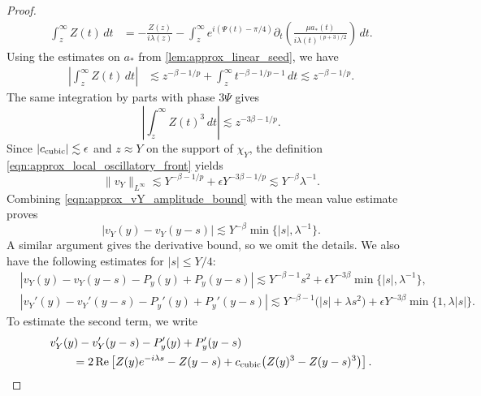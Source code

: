 \documentclass[11pt]{amsart}
\theoremstyle{definition}
\theoremstyle{remark}
\numberwithin{equation}{section}
\begin{document}
\begin{proof}
\begin{align*}
        \int_z^\infty Z(t)\,dt
        &=-\frac{Z(z)}{i\lambda(z)}
        -\int_z^\infty e^{i(\Psi(t)-\pi/4)}
        \partial_t\left(\frac{\mu a_*(t)}{i\lambda(t)^{(p+3)/2}}\right)\,dt.
    \end{align*}
    Using the estimates on $a_*$ from \cref{lem:approx_linear_seed}, we have
    \begin{align*}
        \left|\int_z^\infty Z(t)\,dt\right|
        &\lesssim z^{-\beta-1/p}+\int_z^\infty t^{-\beta-1/p-1}\,dt
        \lesssim z^{-\beta-1/p}.
    \end{align*}
    The same integration by parts with phase $3\Psi$ gives
    \[\left|\int_z^\infty Z(t)^3\,dt\right|\lesssim z^{-3\beta-1/p}.\]
    Since $|c_{\textup{cubic}}|\lesssim\epsilon$ and $z \approx Y$ on the support of $\chi_Y$, the definition \eqref{eqn:approx_local_oscillatory_front} yields
    \begin{equation}\label{eqn:approx_vY_amplitude_bound}
        \|v_Y\|_{L^\infty}
        \lesssim Y^{-\beta-1/p}+\epsilon Y^{-3\beta-1/p}
        \lesssim Y^{-\beta}\lambda^{-1}.
    \end{equation}
    Combining \eqref{eqn:approx_vY_amplitude_bound} with the mean value estimate proves
    \[|v_Y(y)-v_Y(y-s)|\lesssim Y^{-\beta}\min\{|s|,\lambda^{-1}\}.\]
    A similar argument gives the derivative bound, so we omit the details.
    We also have the following estimates for $|s|\leq Y/4$:
    \begin{equation}\label{eqn:approx_vY_plane_wave_comparison}
        \begin{aligned}
            &|v_Y(y)-v_Y(y-s)-P_y(y)+P_y(y-s)|\lesssim Y^{-\beta-1}s^2
            +\epsilon Y^{-3\beta}\min\{|s|,\lambda^{-1}\},\\
            &|v_Y'(y)-v_Y'(y-s)-P_y'(y)+P_y'(y-s)| \lesssim Y^{-\beta-1}\bigl(|s|+\lambda s^2\bigr)
            +\epsilon Y^{-3\beta}\min\{1,\lambda|s|\}.
        \end{aligned}
    \end{equation}
    To estimate the second term, we write
    \begin{equation}\label{eqn:approx_vY_slope_comparison_identity}
        \begin{aligned}
            &v_Y'(y)-v_Y'(y-s)-P_y'(y)+P_y'(y-s)\\
            &\qquad=2\operatorname{Re}\left[
            Z(y)e^{-i\lambda s}-Z(y-s)
            +c_{\textup{cubic}}\bigl(Z(y)^3-Z(y-s)^3\bigr)
            \right].
        \end{aligned}
    \end{equation}

\end{proof}
\end{document}
